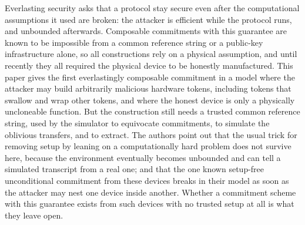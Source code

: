 \documentclass{aicr-conjecture}
\begin{document}

\vspace{0.4em}

\begin{informalconjecture}
Everlasting security asks that a protocol stay secure even after the
computational assumptions it used are broken: the attacker is efficient
while the protocol runs, and unbounded afterwards. Composable
commitments with this guarantee are known to be impossible from a
common reference string or a public-key infrastructure alone, so all
constructions rely on a physical assumption, and until recently they
all required the physical device to be honestly manufactured. This
paper gives the first everlastingly composable commitment in a model
where the attacker may build arbitrarily malicious hardware tokens,
including tokens that swallow and wrap other tokens, and where the
honest device is only a physically uncloneable function. But the
construction still needs a trusted common reference string, used by the
simulator to equivocate commitments, to simulate the oblivious
transfers, and to extract. The authors point out that the usual trick
for removing setup by leaning on a computationally hard problem does
not survive here, because the environment eventually becomes unbounded
and can tell a simulated transcript from a real one; and that the one
known setup-free unconditional commitment from these devices breaks in
their model as soon as the attacker may nest one device inside another.
Whether a commitment scheme with this guarantee exists from such
devices with no trusted setup at all is what they leave open.
\end{informalconjecture}
\end{document}
